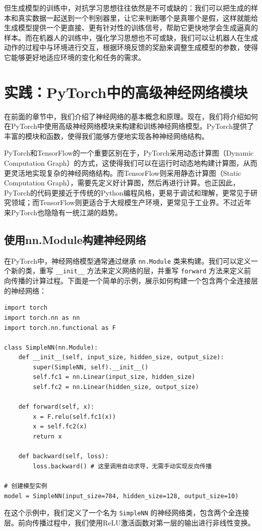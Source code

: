 但生成模型的训练中，对抗学习思想往往依然是不可或缺的：我们可以把生成的样本和真实数据一起送到一个判别器里，让它来判断哪个是真哪个是假，这样就能给生成模型提供一个更直接、更有针对性的训练信号，帮助它更快地学会生成逼真的样本。而在机器人的训练中，强化学习思想也不可或缺，我们可以让机器人在生成动作的过程中与环境进行交互，根据环境反馈的奖励来调整生成模型的参数，使得它能够更好地适应环境的变化和任务的需求。

\section{实践：PyTorch中的高级神经网络模块}

在前面的章节中，我们介绍了神经网络的基本概念和原理。现在，我们将介绍如何在PyTorch中使用高级神经网络模块来构建和训练神经网络模型。PyTorch提供了丰富的模块和函数，使得我们能够方便地实现各种神经网络结构。

PyTorch和TensorFlow的一个重要区别在于，PyTorch采用动态计算图（Dynamic Computation Graph）的方式，这使得我们可以在运行时动态地构建计算图，从而更灵活地实现复杂的神经网络结构。而TensorFlow则采用静态计算图（Static Computation Graph），需要先定义好计算图，然后再进行计算。也正因此，PyTorch的代码更接近于传统的Python编程风格，更易于调试和理解，更常见于研究领域；而TensorFlow则更适合于大规模生产环境，更常见于工业界。不过近年来PyTorch也隐隐有一统江湖的趋势。

\subsection{使用nn.Module构建神经网络}

在PyTorch中，神经网络模型通常通过继承 \verb|nn.Module| 类来构建。我们可以定义一个新的类，重写 \verb|__init__| 方法来定义网络的层，并重写 \verb|forward| 方法来定义前向传播的计算过程。下面是一个简单的示例，展示如何构建一个包含两个全连接层的神经网络：
\begin{verbatim}
import torch
import torch.nn as nn
import torch.nn.functional as F

class SimpleNN(nn.Module):
    def __init__(self, input_size, hidden_size, output_size):
        super(SimpleNN, self).__init__()
        self.fc1 = nn.Linear(input_size, hidden_size)
        self.fc2 = nn.Linear(hidden_size, output_size)

    def forward(self, x):
        x = F.relu(self.fc1(x))
        x = self.fc2(x)
        return x

    def backward(self, loss):
        loss.backward() # 这里调用自动求导，无需手动实现反向传播
    
# 创建模型实例
model = SimpleNN(input_size=784, hidden_size=128, output_size=10)
\end{verbatim}
在这个示例中，我们定义了一个名为 \verb|SimpleNN| 的神经网络类，包含两个全连接层。前向传播过程中，我们使用ReLU激活函数对第一层的输出进行非线性变换。

